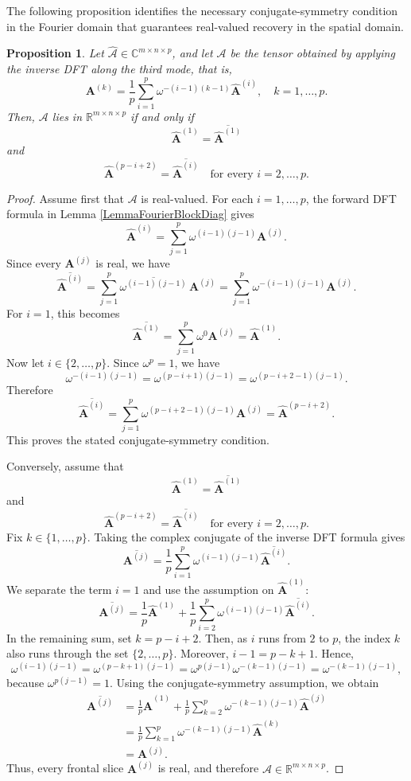 \documentclass[pdflatex,sn-mathphys-ay]{sn-jnl}
\newcommand{\T}[1]{\mathcal{#1}}    %
\newcommand{\M}[1]{\bm{#1}}     %
\newcommand{\C}{\mathbb{C}}         %
\newcommand{\R}{\mathbb{R}}         %
\theoremstyle{thmstyleone}
\newtheorem{proposition}[theorem]{Proposition}
\theoremstyle{thmstyletwo}
\theoremstyle{thmstylethree}
\numberwithin{equation}{section}
\begin{document}
The following proposition identifies the necessary conjugate-symmetry condition in the Fourier domain that guarantees real-valued recovery in the spatial domain.

\begin{proposition}
\label{prop:real_recovery}
Let $\widehat{\T{A}} \in \C^{m \times n \times p}$, and let $\T{A}$ be the tensor obtained by applying the inverse DFT along the third mode, that is,
$$
\M{A}^{(k)} = \frac{1}{p}\sum_{i=1}^{p}\omega^{-(i-1)(k-1)}\widehat{\M{A}}^{(i)},
\quad k=1,\dots,p.
$$
Then, $\T{A}$ lies in $\R^{m \times n \times p}$ if and only if
$$
\widehat{\M{A}}^{(1)} = \overline{\widehat{\M{A}}^{(1)}}
$$
and
$$
\widehat{\M{A}}^{(p-i+2)} = \overline{\widehat{\M{A}}^{(i)}}
\quad \text{for every } i=2,\dots,p.
$$
\end{proposition}
\begin{proof}
Assume first that $\T{A}$ is real-valued. For each $i=1,\dots,p$, the forward DFT formula in Lemma \ref{LemmaFourierBlockDiag} gives
$$
\widehat{\M{A}}^{(i)} = \sum_{j=1}^{p}\omega^{(i-1)(j-1)}\M{A}^{(j)}.
$$
Since every $\M{A}^{(j)}$ is real, we have
$$
\overline{\widehat{\M{A}}^{(i)}}
=
\sum_{j=1}^{p}\overline{\omega^{(i-1)(j-1)}}\,\M{A}^{(j)}
=
\sum_{j=1}^{p}\omega^{-(i-1)(j-1)}\M{A}^{(j)}.
$$
For $i=1$, this becomes
$$
\overline{\widehat{\M{A}}^{(1)}}
=
\sum_{j=1}^{p}\omega^{0}\M{A}^{(j)}
=
\widehat{\M{A}}^{(1)}.
$$
Now let $i \in \{2,\dots,p\}$. Since $\omega^{p}=1$, we have
$$
\omega^{-(i-1)(j-1)}
=
\omega^{(p-i+1)(j-1)}
=
\omega^{(p-i+2-1)(j-1)}.
$$
Therefore
$$
\overline{\widehat{\M{A}}^{(i)}}
=
\sum_{j=1}^{p}\omega^{(p-i+2-1)(j-1)}\M{A}^{(j)}
=
\widehat{\M{A}}^{(p-i+2)}.
$$
This proves the stated conjugate-symmetry condition.

Conversely, assume that
$$
\widehat{\M{A}}^{(1)} = \overline{\widehat{\M{A}}^{(1)}}
$$
and
$$
\widehat{\M{A}}^{(p-i+2)} = \overline{\widehat{\M{A}}^{(i)}}
\quad \text{for every } i=2,\dots,p.
$$
Fix $k \in \{1,\dots,p\}$. Taking the complex conjugate of the inverse DFT formula gives
$$
\overline{\M{A}^{(j)}}
=
\frac{1}{p}\sum_{i=1}^{p}\omega^{(i-1)(j-1)}\overline{\widehat{\M{A}}^{(i)}}.
$$
We separate the term $i=1$ and use the assumption on $\widehat{\M{A}}^{(1)}$:
$$
\overline{\M{A}^{(j)}}
=
\frac{1}{p}\widehat{\M{A}}^{(1)}
+
\frac{1}{p}\sum_{i=2}^{p}\omega^{(i-1)(j-1)}\overline{\widehat{\M{A}}^{(i)}}.
$$
In the remaining sum, set $k = p-i+2$.
Then, as $i$ runs from $2$ to $p$, the index $k$ also runs through the set $\{2,\dots,p\}$. 
Moreover, $i-1 = p-k+1$.
Hence,
$$
\omega^{(i-1)(j-1)}
=
\omega^{(p-k+1)(j-1)}
=
\omega^{p(j-1)}\omega^{-(k-1)(j-1)}
=
\omega^{-(k-1)(j-1)},
$$
because $\omega^{p(j-1)} = 1$. Using the conjugate-symmetry assumption, we obtain
\begin{align*}
\overline{\M{A}^{(j)}}
&=
\frac{1}{p}\widehat{\M{A}}^{(1)}
+
\frac{1}{p}\sum_{k=2}^{p}\omega^{-(k-1)(j-1)}\widehat{\M{A}}^{(j)} \\
&=
\frac{1}{p}\sum_{k=1}^{p}\omega^{-(k-1)(j-1)}\widehat{\M{A}}^{(k)} \\
&=
\M{A}^{(j)}.
\end{align*}
Thus, every frontal slice $\M{A}^{(j)}$ is real, and therefore $\T{A} \in \R^{m \times n \times p}$.
\end{proof}
\end{document}

